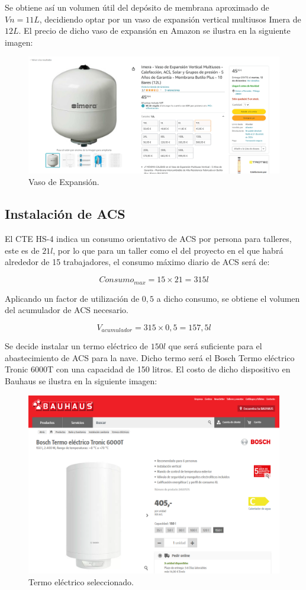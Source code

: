 \documentclass[../main.tex]{subfiles}
\begin{document}
Se obtiene así un volumen útil del depósito de membrana aproximado de $Vn = 11 L$, decidiendo optar por un vaso de expansión vertical multiusos Imera de $12 L$. El precio de dicho vaso de expansión en Amazon se ilustra en la siguiente imagen:
\begin{figure}[H]
    \centering
    \includegraphics[width=0.5\linewidth]{Imagenes/Vaso de Expansion.png}
    \caption{Vaso de Expansión.}
\end{figure}

\subsection{Instalación de ACS}
El CTE HS-4 indica un consumo orientativo de ACS por persona para talleres, este es de $21 l$, por lo que para un taller como el del proyecto en el que habrá alrededor de 15 trabajadores, el consumo máximo diario de ACS será de:

\[Consumo_{max} = 15 \times 21 = 315 l\]

Aplicando un factor de utilización de $0,5$ a dicho consumo, se obtiene el volumen del acumulador de ACS necesario.

\[V_{acumulador} = 315 \times 0,5 = 157,5 l\]

Se decide instalar un termo eléctrico de $150 l$ que será suficiente para el abastecimiento de ACS para la nave. Dicho termo será el Bosch Termo eléctrico Tronic 6000T con una capacidad de 150 litros. El costo de dicho dispositivo en Bauhaus se ilustra en la siguiente imagen:

\begin{figure}[H]
    \centering
    \includegraphics[width=0.5\linewidth]{Imagenes/Termo.png}
    \caption{Termo eléctrico seleccionado.}
\end{figure}
\end{document}
